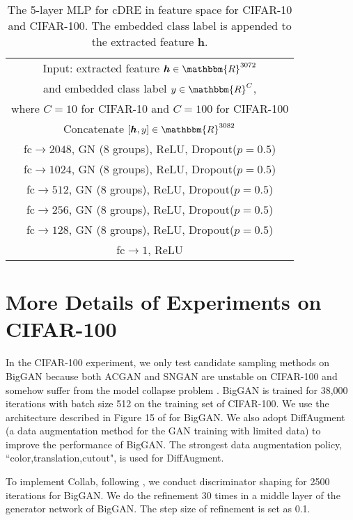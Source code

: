 \documentclass[final,12pt, 3p,times]{elsarticle}
\begin{document}
\begin{table}[h]
	\centering
	\caption{The 5-layer MLP for cDRE in feature space for CIFAR-10 and CIFAR-100. The embedded class label is appended to the extracted feature $\bm{h}$.}
\begin{tabular}{c}
			\toprule
			Input: extracted feature $\bm{h}\in \mathbbm{R}^{3072}$ \\
			and embedded class label $y\in \mathbbm{R}^{C}$, \\
			where $C=10$ for CIFAR-10 and $C=100$ for CIFAR-100 \\
			\hline
			Concatenate $[\bm{h},y]\in \mathbbm{R}^{3082}$\\
			\hline
			fc$\rightarrow 2048$, GN (8 groups), ReLU, Dropout($p=0.5$) \\\hline
			fc$\rightarrow 1024$, GN (8 groups), ReLU, Dropout($p=0.5$) \\\hline
			fc$\rightarrow 512$, GN (8 groups), ReLU, Dropout($p=0.5$) \\\hline
			fc$\rightarrow 256$, GN (8 groups), ReLU, Dropout($p=0.5$) \\\hline
			fc$\rightarrow 128$, GN (8 groups), ReLU, Dropout($p=0.5$) \\\hline
			fc$\rightarrow 1$, ReLU \\
			\bottomrule
		\end{tabular}\label{tab:cifar10_cMLP5}\end{table}




\section{More Details of Experiments on CIFAR-100}\label{supp:details_of_cifar100}

In the CIFAR-100 experiment, we only test candidate sampling methods on BigGAN because both ACGAN and SNGAN are unstable on CIFAR-100 and somehow suffer from the model collapse problem \cite{gulrajani2017improved}. BigGAN is trained for 38,000 iterations with batch size 512 on the training set of CIFAR-100. We use the architecture described in Figure 15 of \cite{brock2018large} for BigGAN. We also adopt DiffAugment \cite{zhao2020differentiable} (a data augmentation method for the GAN training with limited data) to improve the performance of BigGAN. The strongest data augmentation policy, ``color,translation,cutout", is used for DiffAugment.

To implement Collab, following \cite{liu2020collaborative}, we conduct discriminator shaping for 2500 iterations for BigGAN. We do the refinement 30 times in a middle layer of the generator network of BigGAN. The step size of refinement is set as 0.1. 
\end{document}
